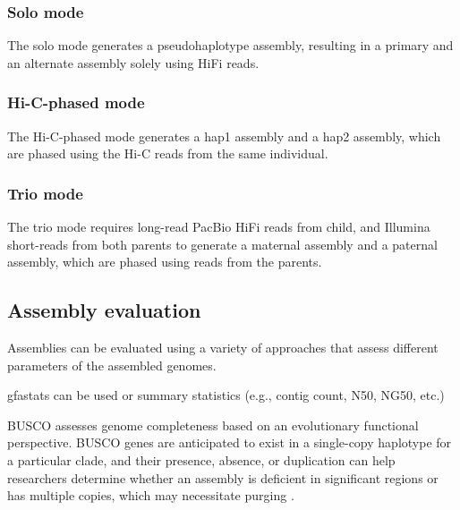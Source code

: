\documentclass[
]{book}
\begin{document}
\hypertarget{host-genome-assembly-hifiasm-solo}{%
\subsubsection*{Solo mode}\label{host-genome-assembly-hifiasm-solo}}

The solo mode generates a pseudohaplotype assembly, resulting in a primary and an alternate assembly solely using HiFi reads.

\hypertarget{host-genome-assembly-hifiasm-Hi-C}{%
\subsubsection*{Hi-C-phased mode}\label{host-genome-assembly-hifiasm-Hi-C}}

The Hi-C-phased mode generates a hap1 assembly and a hap2 assembly, which are phased using the Hi-C reads from the same individual.

\hypertarget{host-genome-assembly-hifiasm-trio}{%
\subsubsection*{Trio mode}\label{host-genome-assembly-hifiasm-trio}}

The trio mode requires long-read PacBio HiFi reads from child, and Illumina short-reads from both parents to generate a maternal assembly and a paternal assembly, which are phased using reads from the parents.

\hypertarget{host-genome-assembly-evaluation}{%
\subsection{Assembly evaluation}\label{host-genome-assembly-evaluation}}

Assemblies can be evaluated using a variety of approaches that assess different parameters of the assembled genomes.

gfastats can be used or summary statistics (e.g., contig count, N50, NG50, etc.)

BUSCO assesses genome completeness based on an evolutionary functional perspective. BUSCO genes are anticipated to exist in a single-copy haplotype for a particular clade, and their presence, absence, or duplication can help researchers determine whether an assembly is deficient in significant regions or has multiple copies, which may necessitate purging \citep{Simao2015-ex}.
\end{document}
